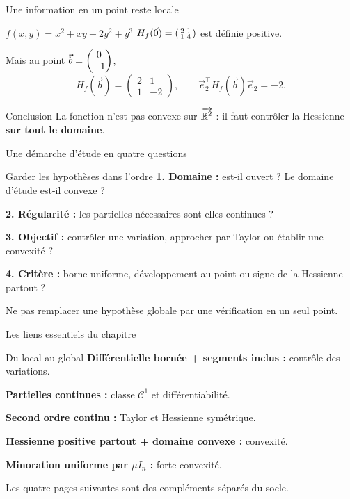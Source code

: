 \begin{frame}[t]{Une information en un point reste locale}
\coursanalyse
\begin{exemple}{$f(x,y)=x^2+xy+2y^2+y^3$}
$H_f(\vec 0)=\left(\begin{smallmatrix}2&1\\1&4\end{smallmatrix}\right)$ est définie positive.

\medskip
Mais au point $\vec b=\begin{pmatrix}0\\-1\end{pmatrix}$,
\[H_f(\vec b)=\begin{pmatrix}2&1\\1&-2\end{pmatrix},\qquad
\vec e_2^\top H_f(\vec b)\vec e_2=-2.\]
\end{exemple}
\begin{resultat}{Conclusion}
La fonction n'est pas convexe sur $\overrightarrow{\mathbb R^{2}}$ : il faut contrôler la Hessienne \textbf{sur tout le domaine}.
\end{resultat}
\end{frame}

\begin{frame}[t]{Une démarche d’étude en quatre questions}
\coursanalyse
\begin{cours}{Garder les hypothèses dans l’ordre}
\textbf{1. Domaine :} est-il ouvert ? Le domaine d'étude est-il convexe ?

\medskip
\textbf{2. Régularité :} les partielles nécessaires sont-elles continues ?

\medskip
\textbf{3. Objectif :} contrôler une variation, approcher par Taylor ou établir une convexité ?

\medskip
\textbf{4. Critère :} borne uniforme, développement au point ou signe de la Hessienne partout ?
\end{cours}
\vfill Ne pas remplacer une hypothèse globale par une vérification en un seul point.
\end{frame}

\begin{frame}[t]{Les liens essentiels du chapitre}
\coursanalyse
\begin{cours}{Du local au global}
\textbf{Différentielle bornée + segments inclus :} contrôle des variations.

\medskip
\textbf{Partielles continues :} classe $\mathcal C^1$ et différentiabilité.

\medskip
\textbf{Second ordre continu :} Taylor et Hessienne symétrique.

\medskip
\textbf{Hessienne positive partout + domaine convexe :} convexité.

\medskip
\textbf{Minoration uniforme par $\mu I_n$ :} forte convexité.
\end{cours}
\vfill Les quatre pages suivantes sont des compléments séparés du socle.
\end{frame}

